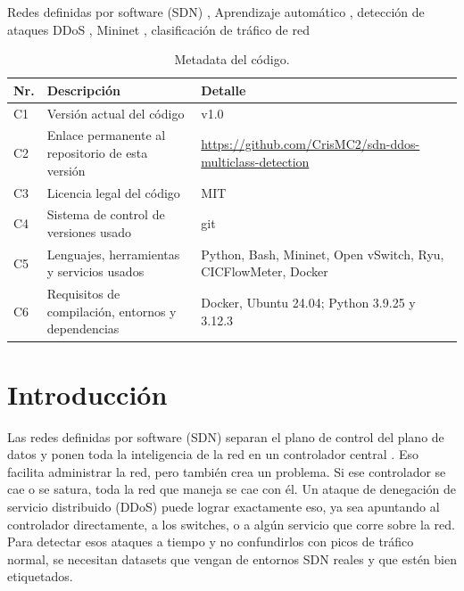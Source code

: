 \documentclass[a4paper,fleqn]{cas-dc}
\begin{document}
\begin{keywords}
Redes definidas por software (SDN) \sep
Aprendizaje automático \sep
detección de ataques DDoS \sep
Mininet \sep
clasificación de tráfico de red
\end{keywords}

\maketitle

\begin{table}[t]
      \small
      \caption{Metadata del código.}\label{tbl:metadata}
      \begin{tabular*}{\textwidth}{@{}p{1cm}p{6.5cm}L@{}}
            \toprule
            Nr. & Descripción & Detalle \\
            \midrule
            C1 & Versión actual del código & v1.0 \\
            C2 & Enlace permanente al repositorio de esta versión & \url{https://github.com/CrisMC2/sdn-ddos-multiclass-detection} \\
            C3 & Licencia legal del código & MIT \\
            C4 & Sistema de control de versiones usado & git \\
            C5 & Lenguajes, herramientas y servicios usados & Python, Bash, Mininet, Open vSwitch, Ryu, CICFlowMeter, Docker \\
            C6 & Requisitos de compilación, entornos y dependencias & Docker, Ubuntu 24.04; Python 3.9.25 y 3.12.3 \\
            \bottomrule
      \end{tabular*}
\end{table}

\section{Introducción}\label{sec:intro}

Las redes definidas por software (SDN) separan el plano de control del plano de datos y ponen toda la inteligencia de la red en un controlador central \citep{kreutz2015sdn}. Eso facilita administrar la red, pero también crea un problema. Si ese controlador se cae o se satura, toda la red que maneja se cae con él. Un ataque de denegación de servicio distribuido (DDoS) puede lograr exactamente eso, ya sea apuntando al controlador directamente, a los switches, o a algún servicio que corre sobre la red. Para detectar esos ataques a tiempo y no confundirlos con picos de tráfico normal, se necesitan datasets que vengan de entornos SDN reales y que estén bien etiquetados.
\end{document}
